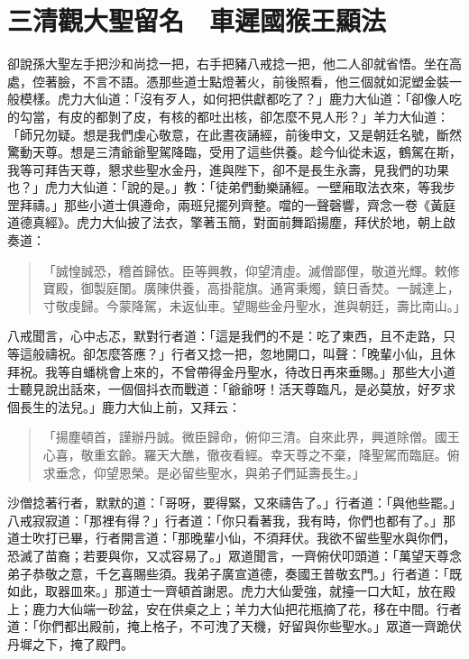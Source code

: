 
\chapter{三清觀大聖留名　車遲國猴王顯法}

卻說孫大聖左手把沙和尚捻一把，右手把豬八戒捻一把，他二人卻就省悟。坐在高處，倥著臉，不言不語。憑那些道士點燈著火，前後照看，他三個就如泥塑金裝一般模樣。虎力大仙道：「沒有歹人，如何把供獻都吃了？」鹿力大仙道：「卻像人吃的勾當，有皮的都剝了皮，有核的都吐出核，卻怎麼不見人形？」羊力大仙道：「師兄勿疑。想是我們虔心敬意，在此晝夜誦經，前後申文，又是朝廷名號，斷然驚動天尊。想是三清爺爺聖駕降臨，受用了這些供養。趁今仙從未返，鶴駕在斯，我等可拜告天尊，懇求些聖水金丹，進與陛下，卻不是長生永壽，見我們的功果也？」虎力大仙道：「說的是。」教：「徒弟們動樂誦經。一壁廂取法衣來，等我步罡拜禱。」那些小道士俱遵命，兩班兒擺列齊整。噹的一聲磬響，齊念一卷《黃庭道德真經》。虎力大仙披了法衣，擎著玉簡，對面前舞蹈揚塵，拜伏於地，朝上啟奏道：
\begin{quote}
「誠惶誠恐，稽首歸依。臣等興教，仰望清虛。滅僧鄙俚，敬道光輝。敕修寶殿，御製庭闈。廣陳供養，高掛龍旗。通宵秉燭，鎮日香焚。一誠達上，寸敬虔歸。今蒙降駕，未返仙車。望賜些金丹聖水，進與朝廷，壽比南山。」
\end{quote}

八戒聞言，心中忐忑，默對行者道：「這是我們的不是：吃了東西，且不走路，只等這般禱祝。卻怎麼答應？」行者又捻一把，忽地開口，叫聲：「晚輩小仙，且休拜祝。我等自蟠桃會上來的，不曾帶得金丹聖水，待改日再來垂賜。」那些大小道士聽見說出話來，一個個抖衣而戰道：「爺爺呀！活天尊臨凡，是必莫放，好歹求個長生的法兒。」鹿力大仙上前，又拜云：
\begin{quote}
「揚塵頓首，謹辦丹誠。微臣歸命，俯仰三清。自來此界，興道除僧。國王心喜，敬重玄齡。羅天大醮，徹夜看經。幸天尊之不棄，降聖駕而臨庭。俯求垂念，仰望恩榮。是必留些聖水，與弟子們延壽長生。」
\end{quote}

沙僧捻著行者，默默的道：「哥呀，要得緊，又來禱告了。」行者道：「與他些罷。」八戒寂寂道：「那裡有得？」行者道：「你只看著我，我有時，你們也都有了。」那道士吹打已畢，行者開言道：「那晚輩小仙，不須拜伏。我欲不留些聖水與你們，恐滅了苗裔；若要與你，又忒容易了。」眾道聞言，一齊俯伏叩頭道：「萬望天尊念弟子恭敬之意，千乞喜賜些須。我弟子廣宣道德，奏國王普敬玄門。」行者道：「既如此，取器皿來。」那道士一齊頓首謝恩。虎力大仙愛強，就擡一口大缸，放在殿上；鹿力大仙端一砂盆，安在供桌之上；羊力大仙把花瓶摘了花，移在中間。行者道：「你們都出殿前，掩上格子，不可洩了天機，好留與你些聖水。」眾道一齊跪伏丹墀之下，掩了殿門。

